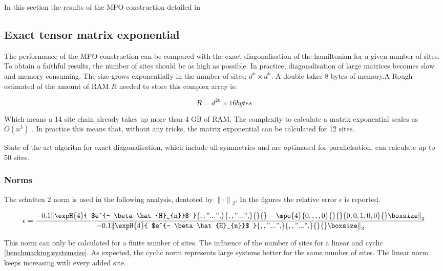 In this section the results of the MPO construction detailed in

\subsection{Exact tensor matrix exponential } \label{chap_bench}

The performance of the MPO construction can be compared with the exact diagonalisation of the hamiltonian for a given number of sites. To obtain a faithful results, the number of sites should be as high as possible. In practice, diagonalisation of large matrices becomes slow and memory consuming. The size grows exponentially in the number of sites: $d^{n} \times d^{n} $. A double takes 8 bytes of memory.A Rough estimated of the amount of RAM $R$ needed to store this complex array is:

\begin{equation}
    R = d^{2 n} \times 16 bytes
\end{equation}

Which means a 14 site chain already takes up more than 4 GB of RAM. The complexity to calculate a matrix exponential scales as $O(n^3)$ \cite{Moler2003}. In practice this means that, without any tricks, the matrix exponential can be calculated for 12 sites.

State of the art algoritm for exact diagonalisation, which include all symmetries and are optimased for parallelsation, can calculate up to 50 sites. \cite{Wietek2018}

\subsubsection{Norms} \label{mponormdef}
\def \expHBlock {\expH{4}{ $e^{- \beta \hat{H}_{n}}$   }{ {,,"...",} }{ {,,"...",} }{}{} }
\def \Mn {\mpo{4}{ {0,,,,0}  }{}{}{{0,0,1,0,0}}{}}

The schatten 2 norm is used in the following analysis, dentoted by ${\| \cdot \|} _{2}$. In the figures the relative error $\epsilon$ is reported.

\begin{equation}
    \epsilon = \frac{  {  \left \|  \expHBlock - \Mn  \right \|} _{2}  }{ {  \left\|  \expHBlock \right \|}_2}
\end{equation}

This norm can only be calculated for a finite number of sites. The influence of the number of sites for a linear  and cyclic \cref{benchmarking:systemsize}. As expected, the cyclic norm represents large systems better for the same number of sites. The linear norm keeps increasing with every added site.

